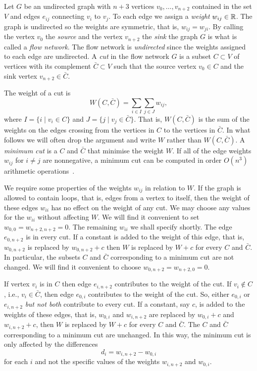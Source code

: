 \documentclass[final,leqno]{siamltex}
\begin{document}
Let $G$ be an undirected graph with $n+3$ vertices $v_0, \dots, v_{n+2}$ contained in the set $V$ and edges $e_{ij}$ connecting $v_i$ to $v_j$.  To each edge we assign a \emph{weight} $w_{ij} \in {\mathbb R}$.  The graph is undirected so the weights are symmetric, that is, $w_{ij} = w_{ji}$.  By calling the vertex $v_0$ the \emph{source} and the vertex $v_{n+2}$ the \emph{sink} the graph $G$ is what is called a \emph{flow network}.  The flow network is \emph{undirected} since the weights assigned to each edge are undirected.  A \emph{cut} in the flow network $G$ is a subset $C \subset V$ of vertices with its complement $\bar{C} \subset V$ such that the source vertex $v_0 \in C$ and the sink vertex $v_{n+2} \in \bar{C}$.  %

The weight of a cut is
\[
W(C,\bar{C}) = \sum_{i \in I} \sum_{j \in J} w_{ij}, 
\]
where $I = \{ i \mid v_i \in C\}$ and $J = \{j \mid v_j \in \bar{C}\}$.  That is, $W(C,\bar{C})$ is the sum of the weights on the edges crossing from the vertices in $C$ to the vertices in $\bar{C}$.  In what follows we will often drop the argument and write $W$ rather than $W(C,\bar{C})$.  A \emph{minimum cut} is a $C$ and $\bar{C}$ that minimise the weight $W$.  If all of the edge weights $w_{ij}$ for $i \neq j$ are nonnegative, a minimum cut can be computed in 
order $O(n^3)$ arithmetic operations~\cite{Cormen2001,Even_graph_algorithms_1979}.

We require some properties of the weights $w_{ij}$ in relation to $W$.  If the graph is allowed to contain loops, that is, edges from a vertex to itself, then the weight of these edges $w_{ii}$ has no effect on the weight of any cut.  We may choose any values for the $w_{ii}$ without affecting $W$.  We will find it convenient to set $w_{0,0} = w_{n+2,n+2} = 0$.  The remaining $w_{ii}$ we shall specify shortly.  The edge $e_{0,n+2}$ is in every cut.  If a constant is added to the weight of this edge, that is, $w_{0,n+2}$ is replaced by $w_{0,n+2} + c$ then $W$ is replaced by $W + c$ for every $C$ and $\bar{C}$.  In particular, the subsets $C$ and $\bar{C}$ corresponding to a minimum cut are not changed.  We will find it convenient to choose $w_{0,n+2} = w_{n+2,0} = 0$.  

If vertex $v_i$ is in $C$ then edge $e_{i,n+2}$ contributes to the weight of the cut.  If $v_i \notin C$, i.e., $v_i \in \bar{C}$, then edge $e_{0,i}$ contributes to the weight of the cut.  So, either $e_{0,i}$ or $e_{i,n+2}$ \emph{but not both} contribute to every cut.  If a constant, say $c$, is added to the weights of these edges, that is, $w_{0,i}$ and $w_{i,n+2}$ are replaced by $w_{0,i} + c$ and $w_{i,n+2} + c$, then $W$ is replaced by $W + c$ for every $C$ and $\bar{C}$.  The $C$ and $\bar{C}$ corresponding to a minimum cut are unchanged.  In this way, the minimum cut is only affected by the differences 
\[
d_i = w_{i,n+2} - w_{0,i}
\]
for each $i$ and not the specific values of the weights $w_{i,n+2}$ and $w_{0,i}$.  %
\end{document}
